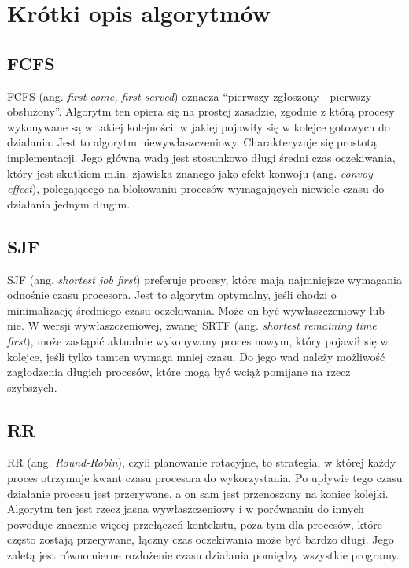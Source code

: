 \documentclass{article}
\begin{document}
\section{Krótki opis algorytmów}

\subsection{FCFS}

FCFS (ang. \textit{first-come, first-served}) oznacza ``pierwszy zgłoszony - pierwszy obsłużony''.
Algorytm ten opiera się na prostej zasadzie,
zgodnie z którą procesy wykonywane są w takiej kolejności,
w jakiej pojawiły się w kolejce gotowych do działania.
Jest to algorytm niewywłaszczeniowy.
Charakteryzuje się prostotą implementacji.
Jego główną wadą jest stosunkowo długi średni czas oczekiwania,
który jest skutkiem m.in. zjawiska znanego jako efekt konwoju (ang. \textit{convoy effect}),
polegającego na blokowaniu procesów wymagających niewiele czasu do działania jednym długim.

\subsection{SJF}

SJF (ang. \textit{shortest job first}) preferuje procesy,
które mają najmniejsze wymagania odnośnie czasu procesora.
Jest to algorytm optymalny, jeśli chodzi o minimalizację średniego czasu oczekiwania.
Może on być wywłaszczeniowy lub nie.
W wersji wywłaszczeniowej, zwanej SRTF (ang. \textit{shortest remaining time first}),
może zastąpić aktualnie wykonywany proces nowym,
który pojawił się w kolejce, jeśli tylko tamten wymaga mniej czasu.
Do jego wad należy możliwość zagłodzenia długich procesów,
które mogą być wciąż pomijane na rzecz szybszych.

\subsection{RR}

RR (ang. \textit{Round-Robin}), czyli planowanie rotacyjne,
to strategia, w której każdy proces otrzymuje kwant czasu procesora do wykorzystania.
Po upływie tego czasu działanie procesu jest przerywane,
a on sam jest przenoszony na koniec kolejki.
Algorytm ten jest rzecz jasna wywłaszczeniowy i w porównaniu do innych powoduje znacznie więcej przełączeń kontekstu,
poza tym dla procesów, które często zostają przerywane,
łączny czas oczekiwania może być bardzo długi.
Jego zaletą jest równomierne rozłożenie czasu działania pomiędzy wszystkie programy.
\end{document}

